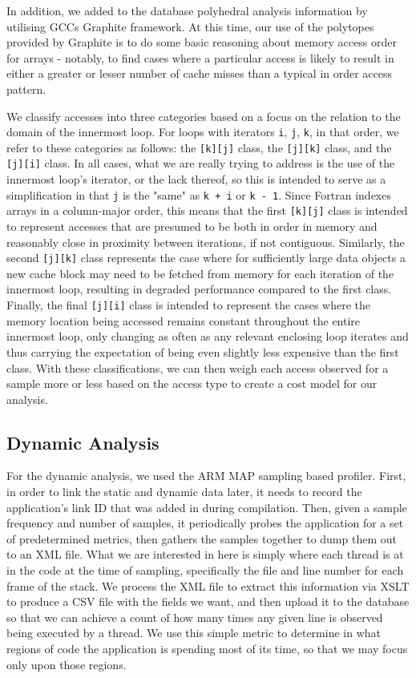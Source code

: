 In addition, we added to the database
polyhedral analysis information by utilising \acsp{GCC} Graphite framework\cite{trifunovic:inria-00551516}.
At this time, our use of the polytopes provided by Graphite is to do some basic reasoning about memory access order for arrays - notably, to find cases where a particular access is likely to result in either a greater or lesser number of cache misses than a typical in order access pattern.

We classify accesses into three categories based on a focus on the relation to the domain of the innermost loop.
For loops with iterators \texttt{i}, \texttt{j}, \texttt{k}, in that order, we refer to these categories as follows: the \texttt{[k][j]} class, the \texttt{[j][k]} class, and the \texttt{[j][i]} class.
In all cases, what we are really trying to address is the use of the innermost loop's iterator, or the lack thereof, so this is intended to serve as a simplification in that \texttt{j} is the "same" as \texttt{k + i} or \texttt{k - 1}.
Since Fortran indexes arrays in a column-major order, this means that the first \texttt{[k][j]} class is intended to represent accesses that are presumed to be both in order in memory and reasonably close in proximity between iterations, if not contiguous.
Similarly, the second \texttt{[j][k]} class represents the case where for sufficiently large data objects a new cache block may need to be fetched from memory for each iteration of the innermost loop, resulting in degraded performance compared to the first class.
Finally, the final \texttt{[j][i]} class is intended to represent the cases where the memory location being accessed remains constant throughout the entire innermost loop, only changing as often as any relevant enclosing loop iterates and thus carrying the expectation of being even slightly less expensive than the first class.
With these classifications, we can then weigh each access observed for a sample more or less based on the access type to create a cost model for our analysis.%
\subsection{Dynamic Analysis}
\label{sec:dynamic}
For the dynamic analysis, we used the ARM MAP sampling based profiler.
First, in order to link the static and dynamic data later, it needs to record the application's link ID that was added in during compilation.
Then, given a sample frequency and number of samples, it periodically probes the application for a set of predetermined metrics, then gathers the samples together to dump them out to an \acs{XML} file.
What we are interested in here is simply where each thread is at in the code at the time of sampling, specifically the file and line number for each frame of the stack.
We process the \acs{XML} file to extract this information via \ac{XSLT} to produce a \acs{CSV} file with the fields we want, and then upload it to the database so that we can achieve a count of how many times any given line is observed being executed by a thread.
We use this simple metric to determine in what regions of code the application is spending most of its time, so that we may focus only upon those regions.

